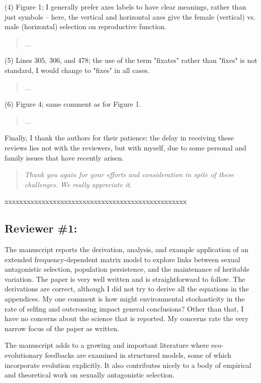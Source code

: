 \documentclass[11pt]{article}
\begin{document}
\noindent (4) Figure 1; I generally prefer axes labels to have clear meanings, rather than just symbols – here, the vertical and horizontal axes give the female (vertical) vs. male (horizontal) selection on reproductive function.
\begin{quote}
	{\itshape ...}
\end{quote}

\noindent (5) Lines 305, 306, and 478; the use of the term "fixates" rather than "fixes" is not standard, I would change to "fixes" in all cases.
\begin{quote}
	{\itshape ...}
\end{quote}

\noindent (6) Figure 4; same comment as for Figure 1.
\begin{quote}
	{\itshape ...}
\end{quote}

Finally, I thank the authors for their patience; the delay in receiving these reviews lies not with the reviewers, but with myself, due to some personal and family issues that have recently arisen.

\begin{quote}
	{\itshape Thank you again for your efforts and consideration in spite of these challenges. We really appreciate it.}
\end{quote}


\noindent xxxxxxxxxxxxxxxxxxxxxxxxxxxxxxxxxxxxxxxxxxxxxxxxx

\subsection*{Reviewer \#1:}

The manuscript reports the derivation, analysis, and example application of an extended frequency-dependent matrix model to explore links between sexual antagonistic selection, population persistence, and the maintenance of heritable variation. The paper is very well written and is straightforward to follow. The derivations are correct, although I did not try to derive all the equations in the appendices. My one comment is how might environmental stochasticity in the rate of selfing and outcrossing impact general conclusions? Other than that, I have no concerns about the science that is reported. My concerns rate the very narrow focus of the paper as written.

The manuscript adds to a growing and important literature where eco-evolutionary feedbacks are examined in structured models, some of which incorporate evolution explicitly. It also contributes nicely to a body of empirical and theoretical work on sexually antagonistic selection.
\end{document}
